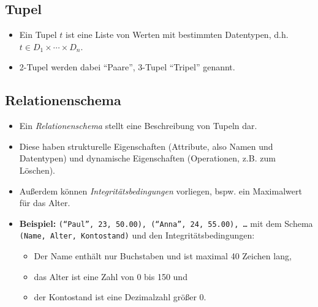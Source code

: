 \documentclass[a4paper, 11pt, accentcolor = tud3b]{tudreport}
\begin{document}
            \subsection{Tupel} %
                \begin{itemize}
                	\item Ein Tupel \(t\) ist eine Liste von Werten mit bestimmten Datentypen, d.h. \( t \in D _ 1 \times \cdots \times D _ n \).
                	\item 2-Tupel werden dabei \enquote{Paare}, 3-Tupel \enquote{Tripel} genannt.
                \end{itemize}

            \subsection{Relationenschema} %
                \begin{itemize}
                	\item Ein \textit{Relationenschema} stellt eine Beschreibung von Tupeln dar.
                	\item Diese haben strukturelle Eigenschaften (Attribute, also Namen und Datentypen) und dynamische Eigenschaften (Operationen, z.B. zum Löschen).
                	\item Außerdem können \textit{Integritätsbedingungen} vorliegen, bspw. ein Maximalwert für das Alter.
                	\item \textbf{Beispiel:} \texttt{(\enquote{Paul}, 23, 50.00), (\enquote{Anna}, 24, 55.00), \dots} mit dem Schema \texttt{(Name, Alter, Kontostand)} und den Integritätsbedingungen:
                		\begin{itemize}
                			\item Der Name enthält nur Buchstaben und ist maximal 40 Zeichen lang,
                			\item das Alter ist eine Zahl von 0 bis 150 und
                			\item der Kontostand ist eine Dezimalzahl größer 0.
                		\end{itemize}
                \end{itemize}
\end{document}
